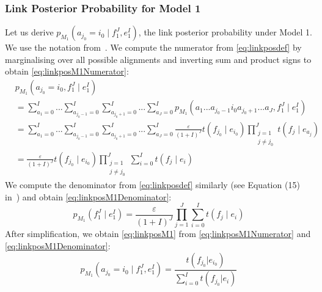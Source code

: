 \subsubsection{Link Posterior Probability for Model 1}

Let us derive $p_{M_1}(a_{j_0} = i_0 \mid f_1^J, e_1^I)$,
the link posterior probability under Model 1. We use the notation
from~\citep{brown-dellapietra-dellapietra-mercer-1993}. We compute the
numerator from
\autoref{eq:linkposdef} by marginalising over all possible alignments and
inverting sum and product signs to obtain \autoref{eq:linkposM1Numerator}:
%
\begin{align}
  & p_{M_1}(a_{j_0}=i_0,f_1^J \mid e_1^I) \nonumber \\
  &= \sum_{a_1 = 0}^{I} ... \sum_{a_{j_0-1} = 0}^{I} \sum_{a_{j_0+1} = 0}^{I} ... \sum_{a_J = 0}^{I} p_{M_1}(a_1 ... a_{j_0-1} i_0 a_{j_0+1} ... a_J,f_1^J \mid e_1^I) \nonumber \\
  &= \sum_{a_1 = 0}^{I} ... \sum_{a_{j_0-1} = 0}^{I} \sum_{a_{j_0+1} = 0}^{I} ... \sum_{a_J = 0}^{I} \frac{\varepsilon}{(1+I)^J} t(f_{j_0} \mid e_{i_0}) \prod_{\substack{j = 1 \\ j \neq j_0}}^J t(f_j \mid e_{a_j}) \nonumber \\
  &= \frac{\varepsilon}{(1+I)^J} t(f_{j_0} \mid e_{i_0}) \prod_{\substack{j = 1 \\ j \neq j_0}}^J \sum_{i=0}^I t(f_j \mid e_i) \label{eq:linkposM1Numerator}
\end{align}
%
We compute the denominator from \autoref{eq:linkposdef}
similarly (see Equation (15)
in~\citep{brown-dellapietra-dellapietra-mercer-1993}) and obtain
\autoref{eq:linkposM1Denominator}:
%
\begin{equation} \label{eq:linkposM1Denominator}
  p_{M_1}(f_1^J \mid e_1^I) = \frac{\varepsilon}{(1+I)^J} \prod_{j=1}^J \sum_{i=0}^I t(f_j \mid e_i)
\end{equation}
%
After simplification, we obtain \autoref{eq:linkposM1} from
\autoref{eq:linkposM1Numerator} and \autoref{eq:linkposM1Denominator}:
%
\begin{equation} \label{eq:linkposM1}
  p_{M_1}(a_{j_0} = i_0 \mid f_1^J, e_1^I) = \frac{t(f_{j_0}|e_{i_0})}{\sum_{i=0}^I t(f_{j_0}|e_i)}
\end{equation}
%

